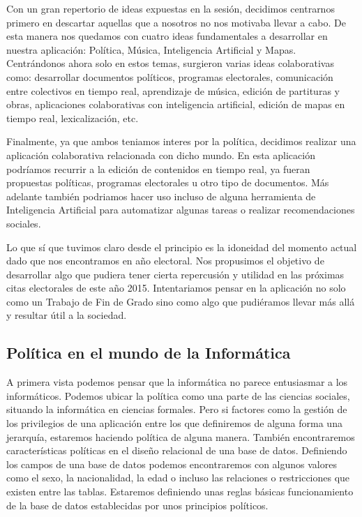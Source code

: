 Con un gran repertorio de ideas expuestas en la sesión, decidimos centrarnos primero en descartar aquellas que a nosotros no nos motivaba llevar a cabo. De esta manera nos quedamos con cuatro ideas fundamentales a desarrollar en nuestra aplicación: Política, Música, Inteligencia Artificial y Mapas. Centrándonos ahora solo en estos temas, surgieron varias ideas colaborativas como: desarrollar documentos políticos, programas electorales, comunicación entre colectivos en tiempo real, aprendizaje de música, edición de partituras y obras, aplicaciones colaborativas con inteligencia artificial, edición de mapas en tiempo real, lexicalización, etc.

Finalmente, ya que ambos teniamos interes por la política, decidimos realizar una aplicación colaborativa relacionada con dicho mundo. En esta aplicación podríamos recurrir a la edición de contenidos en tiempo real, ya fueran propuestas políticas, programas electorales u otro tipo de documentos. Más adelante también podriamos hacer uso incluso de alguna herramienta de Inteligencia Artificial para automatizar algunas tareas o realizar recomendaciones sociales.

Lo que sí que tuvimos claro desde el principio es la idoneidad del momento actual dado que nos encontramos en año electoral. Nos propusimos el objetivo de desarrollar algo que pudiera tener cierta repercusión y utilidad en las próximas citas electorales de este año 2015. Intentariamos pensar en la aplicación no solo como un Trabajo de Fin de Grado sino como algo que pudiéramos llevar más allá y resultar útil a la sociedad.

\subsection{Política en el mundo de la Informática}

A primera vista podemos pensar que la informática no parece entusiasmar a los informáticos. Podemos ubicar la política como una parte de las ciencias sociales, situando la informática en ciencias formales. Pero si factores como la gestión de los privilegios de una aplicación entre los que definiremos de alguna forma una jerarquía, estaremos haciendo política de alguna manera. También encontraremos características políticas en el diseño relacional de una base de datos. Definiendo los campos de una base de datos podemos encontraremos con algunos valores como el sexo, la nacionalidad, la edad o incluso las relaciones o restricciones que existen entre las tablas. Estaremos definiendo unas reglas básicas funcionamiento de la base de datos establecidas por unos principios políticos.

